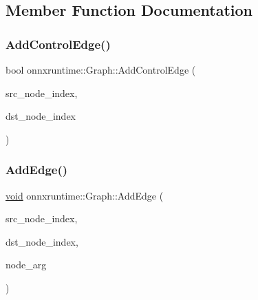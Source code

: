 \subsection{Member Function Documentation}
\mbox{\label{classonnxruntime_1_1Graph_aa348aa7dc35abaeb91399992122e9b11}} 
\subsubsection{\texorpdfstring{Add\+Control\+Edge()}{AddControlEdge()}}
{\footnotesize\ttfamily bool onnxruntime\+::\+Graph\+::\+Add\+Control\+Edge (\begin{DoxyParamCaption}\item[{\mbox{\hyperlink{namespaceonnxruntime_af8773b5c12b5d8fd9292eb2e268df760}{Node\+Index}}}]{src\+\_\+node\+\_\+index,  }\item[{\mbox{\hyperlink{namespaceonnxruntime_af8773b5c12b5d8fd9292eb2e268df760}{Node\+Index}}}]{dst\+\_\+node\+\_\+index }\end{DoxyParamCaption})}

\mbox{\label{classonnxruntime_1_1Graph_a58c003d4e931a6e36e425488873aabf0}} 
\subsubsection{\texorpdfstring{Add\+Edge()}{AddEdge()}}
{\footnotesize\ttfamily \mbox{\hyperlink{mlasi_8h_a88f941d423cb2a819b70a1358982b1a6}{void}} onnxruntime\+::\+Graph\+::\+Add\+Edge (\begin{DoxyParamCaption}\item[{\mbox{\hyperlink{namespaceonnxruntime_af8773b5c12b5d8fd9292eb2e268df760}{Node\+Index}}}]{src\+\_\+node\+\_\+index,  }\item[{\mbox{\hyperlink{namespaceonnxruntime_af8773b5c12b5d8fd9292eb2e268df760}{Node\+Index}}}]{dst\+\_\+node\+\_\+index,  }\item[{const \mbox{\hyperlink{classonnxruntime_1_1NodeArg}{Node\+Arg}} \&}]{node\+\_\+arg }\end{DoxyParamCaption})}

